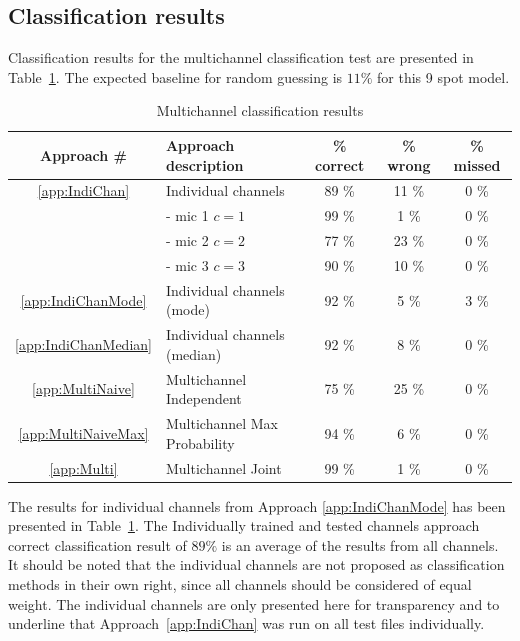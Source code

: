 \subsection{Classification results}\label{sec:MultiAPRResultsClass}
Classification results for the multichannel classification test are presented in Table~\ref{tab:multiAPRresults}. The expected baseline for random guessing is $11 \%$ for this 9 spot model.
\begin{table}\begin{center}
\caption{Multichannel classification results}
\label{tab:multiAPRresults}
\begin{tabular}{|c|l|c|c|c|}\hline
Approach \#             & Approach description        & \% correct    & \% wrong  & \% missed  \\ \hline
\ref{app:IndiChan}      & Individual channels         & 89 \%         & 11 \%     & 0 \%       \\
                        &  - mic 1 $c = 1$            & 99 \%         & 1 \%      & 0 \%       \\
                        &  - mic 2 $c = 2$            & 77 \%         & 23 \%     & 0 \%       \\
                        &  - mic 3 $c = 3$            & 90 \%         & 10 \%     & 0 \%       \\
\ref{app:IndiChanMode}  & Individual channels (mode)  & 92 \%         & 5 \%      & 3 \%       \\
\ref{app:IndiChanMedian}& Individual channels (median)& 92 \%         & 8 \%      & 0 \%       \\
\ref{app:MultiNaive}    & Multichannel Independent    & 75 \%         & 25 \%     & 0 \%       \\
\ref{app:MultiNaiveMax} & Multichannel Max Probability& 94 \%         & 6 \%      & 0 \%       \\
\ref{app:Multi}         & Multichannel Joint          & 99 \%         & 1 \%      & 0 \%       \\ \hline
\end{tabular}\end{center}\end{table}

The results for individual channels from Approach \ref{app:IndiChanMode} has been presented in Table~\ref{tab:multiAPRresults}. The Individually trained and tested channels approach correct classification result of $89\%$ is an average of the results from all channels. It should be noted that the individual channels are not proposed as classification methods in their own right, since all channels should be considered of equal weight. The individual channels are only presented here for transparency and to underline that Approach~\ref{app:IndiChan} was run on all test files individually.

